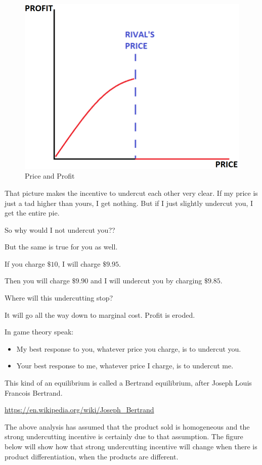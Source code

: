 \documentclass[
]{book}
\providecommand{\tightlist}{%
  \setlength{\itemsep}{0pt}\setlength{\parskip}{0pt}}
\begin{document}
\begin{figure}

{\centering \includegraphics[width=0.5\linewidth]{img/oligopoly/fig6} 

}

\caption{Price and Profit}\label{fig:oligopoly06}
\end{figure}

That picture makes the incentive to undercut each other very clear. If my price is just a tad higher than yours, I get nothing. But if I just slightly undercut you, I get the entire pie.

So why would I not undercut you??

But the same is true for you as well.

If you charge \(\$10\), I will charge \(\$9.95\).

Then you will charge \(\$9.90\) and I will undercut you by charging \(\$9.85\).

Where will this undercutting stop?

It will go all the way down to marginal cost. Profit is eroded.

In game theory speak:

\begin{itemize}
\tightlist
\item
  My best response to you, whatever price you charge, is to undercut you.
\item
  Your best response to me, whatever price I charge, is to undercut me.
\end{itemize}

This kind of an equilibrium is called a Bertrand equilibrium, after Joseph Louis Francois Bertrand.

\url{https://en.wikipedia.org/wiki/Joseph_Bertrand}

The above analysis has assumed that the product sold is homogeneous and the strong undercutting incentive is certainly due to that assumption. The figure below will show how that strong undercutting incentive will change when there is product differentiation, when the products are different.
\end{document}
